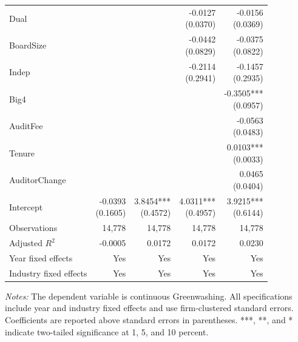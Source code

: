 \begin{table}[htbp]
{\begin{tabular}{lrrrr}
Dual &  &  & \shortstack{-0.0127 \\ (0.0370)} & \shortstack{-0.0156 \\ (0.0369)}\\[8pt]
BoardSize &  &  & \shortstack{-0.0442 \\ (0.0829)} & \shortstack{-0.0375 \\ (0.0822)}\\[8pt]
Indep &  &  & \shortstack{-0.2114 \\ (0.2941)} & \shortstack{-0.1457 \\ (0.2935)}\\[8pt]
Big4 &  &  &  & \shortstack{-0.3505*** \\ (0.0957)}\\[8pt]
AuditFee &  &  &  & \shortstack{-0.0563 \\ (0.0483)}\\[8pt]
Tenure &  &  &  & \shortstack{0.0103*** \\ (0.0033)}\\[8pt]
AuditorChange &  &  &  & \shortstack{0.0465 \\ (0.0404)}\\[8pt]
Intercept & \shortstack{-0.0393 \\ (0.1605)} & \shortstack{3.8454*** \\ (0.4572)} & \shortstack{4.0311*** \\ (0.4957)} & \shortstack{3.9215*** \\ (0.6144)}\\[8pt]
Observations & 14,778 & 14,778 & 14,778 & 14,778\\
Adjusted \(R^2\) & -0.0005 & 0.0172 & 0.0172 & 0.0230\\
Year fixed effects & Yes & Yes & Yes & Yes\\
Industry fixed effects & Yes & Yes & Yes & Yes\\
\hline\end{tabular}}
\begin{minipage}{0.98\textwidth}\footnotesize\textit{Notes:} The dependent variable is continuous Greenwashing. All specifications include year and industry fixed effects and use firm-clustered standard errors. Coefficients are reported above standard errors in parentheses. ***, **, and * indicate two-tailed significance at 1, 5, and 10 percent.\end{minipage}
\end{table}